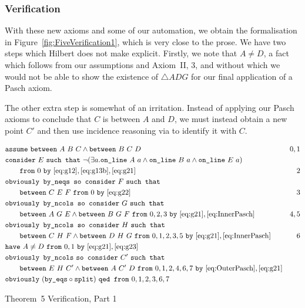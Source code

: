 \subsubsection{Verification}
With these new axioms and some of our automation, we obtain the formalisation in Figure~\ref{fig:FiveVerification1}, which is very close to the prose. We have two steps which Hilbert does not make explicit. Firstly, we note that $A\neq D$, a fact which follows from our assumptions and Axiom~II, 3, and without which we would not be able to show the existence of $\triangle ADG$ for our final application of a Pasch axiom.

The other extra step is somewhat of an irritation. Instead of applying our Pasch axioms to conclude that $C$ is between $A$ and $D$, we must instead obtain a new point $C'$ and then use incidence reasoning via  to identify it with $C$. 

\begin{boxedfigure}
\scriptsize
  \begin{align*}
    &\code{assume}\ \between{A}{B}{C} \wedge \between{B}{C}{D} & 0,1\\
    &\code{consider}\ E\ \code{such that}\ \Triangle{a}{A}{B}{E}\\
    &\qquad\code{from}\ 0\ \code{by}\ \eqref{eq:g12},\eqref{eq:g13b},\eqref{eq:g21} & 2\\
    &\code{obviously by\_neqs so consider}\ F\ \code{such that}\\
    &\qquad\between{C}{E}{F}\ \code{from}\ 0\ \code{by}\ \eqref{eq:g22} & 3\\
    &\code{obviously by\_ncols so consider}\ G\ \code{such that}\\ 
    &\qquad\between{A}{G}{E} \wedge \between{B}{G}{F}\ \code{from}\ 0,2,3\ \code{by}\
    \eqref{eq:g21},\eqref{eq:InnerPasch}& 4,5\\    
    &\code{obviously by\_ncols so consider}\ H\ \code{such that}\\ 
    &\qquad\between{C}{H}{F} \wedge \between{D}{H}{G}\ \code{from}\ 0,1,2,3,5\ \code{by}\ \eqref{eq:g21},\eqref{eq:InnerPasch}& 6\\
    &\code{have}\ A\neq D\ \code{from}\ 0,1\ \code{by}\ \eqref{eq:g21},\eqref{eq:g23}\\
    &\code{obviously by\_ncols}\ \code{so consider}\ C'\ \code{such that}\\
    &\qquad\between{E}{H}{C'}\wedge\between{A}{C'}{D}\ \code{from}\ 0,1,2,4,6,7\ \code{by}\ \eqref{eq:OuterPasch},\eqref{eq:g21}\\
    &\code{obviously}\ (\code{by\_eqs}\circ\code{split})\ \code{qed from}\ 0,1,2,3,6,7
  \end{align*}
  \caption{Theorem~5 Verification, Part 1}
  \label{fig:FiveVerification1}
\end{boxedfigure}

